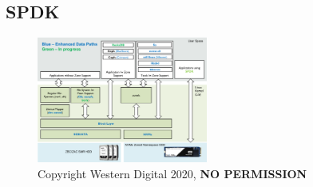 \documentclass[conference]{IEEEtran}
\begin{document}
\subsection{SPDK}

\begin{center}
	\begin{figure}[H]
		\includegraphics[width=0.5\textwidth]{resources/images/spdk-zns-ssd-landscape.png}
		\captionsetup{justification=centering}
		\caption{Copyright Western Digital 2020, \textbf{NO PERMISSION}}
		\label{fig:spdk-landscape}
	\end{figure}
\end{center}



\end{document}
